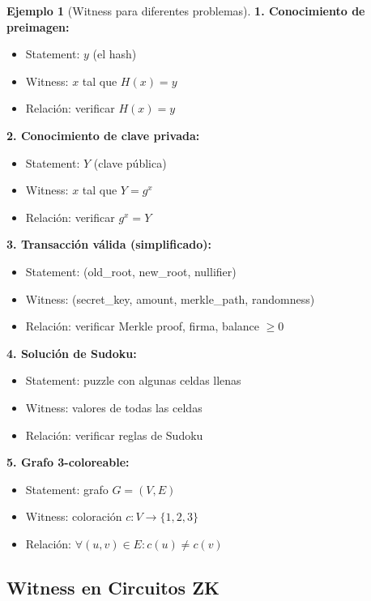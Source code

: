 \documentclass[11pt,a4paper,twoside,openright]{book}
\theoremstyle{definition}
\newtheorem{example}{Ejemplo}[chapter]
\theoremstyle{plain}
\theoremstyle{remark}
\begin{document}
\begin{example}[Witness para diferentes problemas]
\textbf{1. Conocimiento de preimagen:}
\begin{itemize}
    \item Statement: $y$ (el hash)
    \item Witness: $x$ tal que $H(x) = y$
    \item Relación: verificar $H(x) = y$
\end{itemize}

\textbf{2. Conocimiento de clave privada:}
\begin{itemize}
    \item Statement: $Y$ (clave pública)
    \item Witness: $x$ tal que $Y = g^x$
    \item Relación: verificar $g^x = Y$
\end{itemize}

\textbf{3. Transacción válida (simplificado):}
\begin{itemize}
    \item Statement: (old\_root, new\_root, nullifier)
    \item Witness: (secret\_key, amount, merkle\_path, randomness)
    \item Relación: verificar Merkle proof, firma, balance $\geq 0$
\end{itemize}

\textbf{4. Solución de Sudoku:}
\begin{itemize}
    \item Statement: puzzle con algunas celdas llenas
    \item Witness: valores de todas las celdas
    \item Relación: verificar reglas de Sudoku
\end{itemize}

\textbf{5. Grafo 3-coloreable:}
\begin{itemize}
    \item Statement: grafo $G = (V, E)$
    \item Witness: coloración $c: V \to \{1, 2, 3\}$
    \item Relación: $\forall (u,v) \in E: c(u) \neq c(v)$
\end{itemize}
\end{example}

\subsection{Witness en Circuitos ZK}
\end{document}

